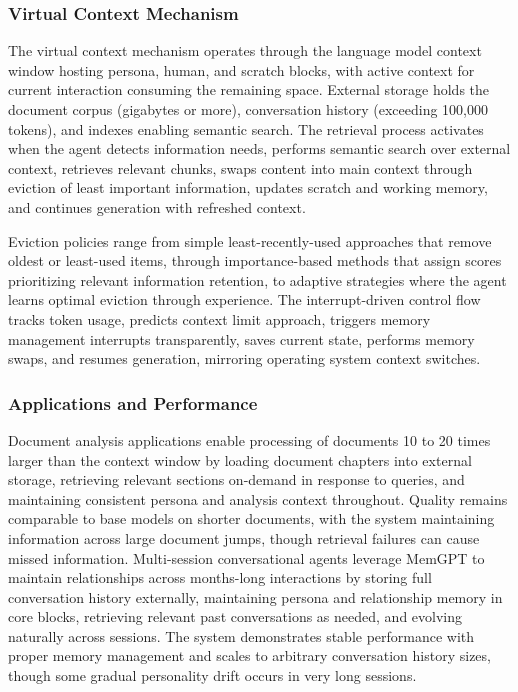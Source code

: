 \subsubsection{Virtual Context Mechanism}

The virtual context mechanism operates through the language model context window hosting persona, human, and scratch blocks, with active context for current interaction consuming the remaining space. External storage holds the document corpus (gigabytes or more), conversation history (exceeding 100,000 tokens), and indexes enabling semantic search. The retrieval process activates when the agent detects information needs, performs semantic search over external context, retrieves relevant chunks, swaps content into main context through eviction of least important information, updates scratch and working memory, and continues generation with refreshed context.

Eviction policies range from simple least-recently-used approaches that remove oldest or least-used items, through importance-based methods that assign scores prioritizing relevant information retention, to adaptive strategies where the agent learns optimal eviction through experience. The interrupt-driven control flow tracks token usage, predicts context limit approach, triggers memory management interrupts transparently, saves current state, performs memory swaps, and resumes generation, mirroring operating system context switches.

\subsubsection{Applications and Performance}

Document analysis applications enable processing of documents 10 to 20 times larger than the context window by loading document chapters into external storage, retrieving relevant sections on-demand in response to queries, and maintaining consistent persona and analysis context throughout. Quality remains comparable to base models on shorter documents, with the system maintaining information across large document jumps, though retrieval failures can cause missed information. Multi-session conversational agents leverage MemGPT to maintain relationships across months-long interactions by storing full conversation history externally, maintaining persona and relationship memory in core blocks, retrieving relevant past conversations as needed, and evolving naturally across sessions. The system demonstrates stable performance with proper memory management and scales to arbitrary conversation history sizes, though some gradual personality drift occurs in very long sessions.

